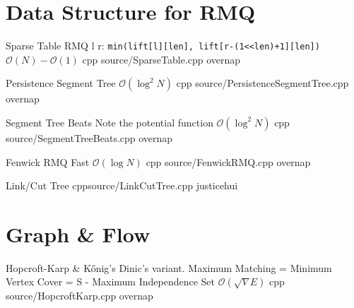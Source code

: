 \documentclass[landscape, 10pt, a4paper, oneside, twocolumn]{extarticle}
\begin{document}
\maketitlepage



\section{Data Structure for RMQ}


\Algorithm
{Sparse Table}
{RMQ l r: \texttt{min(lift[l][len], lift[r-(1<<len)+1][len])}}
{$\mathcal{O}(N)-\mathcal{O}(1)$}
{cpp}
{source/SparseTable.cpp}
{overnap}



\Algorithm
{Persistence Segment Tree}
{}
{$\mathcal{O}(\log^2{N})$}
{cpp}
{source/PersistenceSegmentTree.cpp}
{overnap}

\Algorithm
{Segment Tree Beats}
{Note the potential function}
{$\mathcal{O}(\log^2{N})$}
{cpp}
{source/SegmentTreeBeats.cpp}
{overnap}

\Algorithm
{Fenwick RMQ}
{}
{Fast $\mathcal{O}(\log{N})$}
{cpp}
{source/FenwickRMQ.cpp}
{overnap}


\Algorithm
{Link/Cut Tree}
{}
{}
{cpp}{source/LinkCutTree.cpp}
{justicehui}


\section{Graph \& Flow}


\Algorithm
{Hopcroft-Karp \& Kőnig's}
{Dinic's variant. Maximum Matching = Minimum Vertex Cover = S - Maximum Independence Set}
{$\mathcal{O}(\sqrt{V}E)$}
{cpp}
{source/HopcroftKarp.cpp}
{overnap}

\end{document}
